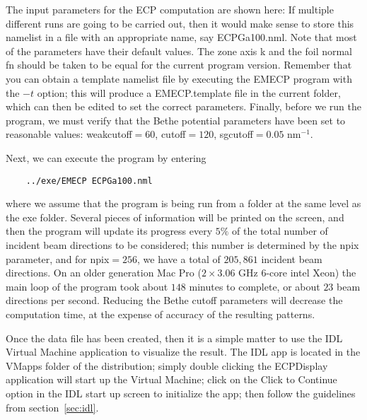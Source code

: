 \documentclass[DIV=calc, paper=letter, fontsize=11pt]{scrartcl}	 %
\begin{document}
The input parameters for the ECP computation are shown here:
If multiple different runs are going to be carried out, then it would make sense to store this namelist in a 
file with an appropriate name, say \textsf{ECPGa100.nml}.  Note that most of the parameters have their default values.  The
zone axis \textsf{k} and the foil normal \textsf{fn} should be taken to be equal for the current program version.
Remember that you can obtain a template namelist file by executing the \textsf{EMECP} program with the $-t$ option; 
this will produce a \textsf{EMECP.template} file in the current folder, which can then be edited to set the correct
parameters. Finally, before we run the program, we must verify that the Bethe potential parameters have been set to reasonable values:
\textsf{weakcutoff}$= 60$, \textsf{cutoff}$= 120$, \textsf{sgcutoff}$=0.05$ nm$^{-1}$.

Next, we can execute the program by entering
\begin{verbatim}
	../exe/EMECP ECPGa100.nml
\end{verbatim}
where we assume that the program is being run from a folder at the same level as the exe folder.  Several pieces of
information will be printed on the screen, and then the program will update its progress every $5\%$ of the total number
of incident beam directions to be considered; this number is determined by the \textsf{npix} parameter, and for 
\textsf{npix}$=256$, we have a total of $205,861$ incident beam directions.
On an older generation Mac Pro ($2\times 3.06$ GHz $6$-core intel Xeon) the main loop of the program took about $148$ minutes
to complete, or about $23$ beam directions per second.  Reducing the Bethe cutoff parameters will decrease the computation time,
at the expense of accuracy of the resulting patterns.

Once the data file has been created, then it is a simple matter to use the IDL Virtual Machine application to 
visualize the result.   The IDL app is located in the VMapps folder of the distribution; simply double clicking the \textsf{ECPDisplay}
application will start up the Virtual Machine; click on the \textsf{Click to Continue} option in the IDL start up screen to 
initialize the app; then follow the guidelines from section~\ref{sec:idl}.

\begin{refsection}[papers]
\nocite{degraef2003b,humphreys1979a,winkelmann2003a,winkelmann2008a,weickenmeier1991a,reimer1985a}%
  \printbibliography[title={References}]
\end{refsection}
\end{document}
